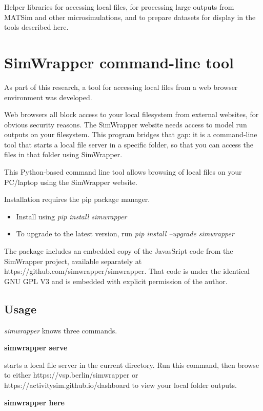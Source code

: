 Helper libraries for accessing local files, for processing large outputs from MATSim and other microsimulations, and to prepare datasets for display in the tools described here.

\section{SimWrapper command-line tool}
\label{appendix-simwrapper}

As part of this research, a tool for accessing local files from a web browser environment was developed.

Web browsers all block access to your local filesystem from external websites, for obvious security reasons. The SimWrapper website needs access to model run outputs on your filesystem. This program bridges that gap: it is a command-line tool that starts a local file server in a specific folder, so that you can access the files in that folder using SimWrapper.

This Python-based command line tool allows browsing of local files on your PC/laptop using the SimWrapper website.

Installation requires the pip package manager.

\begin{itemize}
  \tightlist
  \item Install using \emph{pip install simwrapper}
  \item To upgrade to the latest version, run \emph{pip install --upgrade simwrapper}
\end{itemize}

The package includes an embedded copy of the JavasSript code from the SimWrapper project, available separately at https://github.com/simwrapper/simwrapper. That code is under the identical GNU GPL V3 and is embedded with explicit permission of the author.

\subsection{Usage}

\emph{simwrapper} knows three commands.

\noindent\textbf{simwrapper serve}

starts a local file server in the current directory. Run this command, then browse to either https://vsp.berlin/simwrapper or https://activitysim.github.io/dashboard to view your local folder outputs.

\noindent\textbf{simwrapper here}


